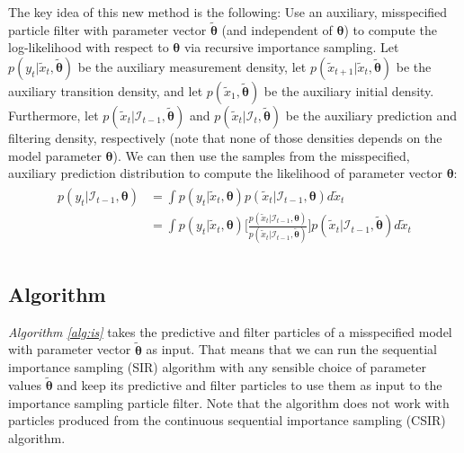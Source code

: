 \documentclass[11pt, oneside]{scrreprt}   	%
\begin{document}
The key idea of this new method is the following: Use an auxiliary, misspecified particle filter with parameter vector $\boldsymbol{\tilde{\theta}}$ (and independent of $\boldsymbol{\theta}$) to compute the log-likelihood with respect to $\boldsymbol{\theta}$ via recursive importance sampling. Let $p(y_t | \tilde{x}_{t}, \boldsymbol{\tilde{\theta}})$ be the auxiliary measurement density, let $p(\tilde{x}_{t+1} | \tilde{x}_{t}, \boldsymbol{\tilde{\theta}})$ be the auxiliary transition density, and let $p(\tilde{x}_1, \boldsymbol{\tilde{\theta}})$ be the auxiliary initial density. Furthermore, let $p(\tilde{x}_{t} | \mathcal{I}_{t-1}, \boldsymbol{\tilde{\theta}})$ and  $p(\tilde{x}_{t} | \mathcal{I}_{t}, \boldsymbol{\tilde{\theta}})$ be the auxiliary prediction and filtering density, respectively (note that none of those densities depends on the model parameter $\boldsymbol{\theta}$). We can then use the samples from the misspecified, auxiliary prediction distribution to compute the likelihood of parameter vector $\boldsymbol{\theta}$: 
\begin{align*} 
\begin{split}
p(y_t | \mathcal{I}_{t-1}, \boldsymbol{\theta}) &= \int p(y_t | \tilde{x}_t, \boldsymbol{\theta}) p(\tilde{x}_t | \mathcal{I}_{t-1}, \boldsymbol{\theta}) d \tilde{x}_t \\
&= \int p(y_t | \tilde{x}_t, \boldsymbol{\theta}) \bigg[ \frac{p(\tilde{x}_t | \mathcal{I}_{t-1}, \boldsymbol{\theta})}{p(\tilde{x}_t | \mathcal{I}_{t-1}, \boldsymbol{\tilde{\theta}})} \bigg] p(\tilde{x}_t | \mathcal{I}_{t-1}, \boldsymbol{\tilde{\theta}}) d \tilde{x}_t \\
\end{split}					
\end{align*}  

\subsection{Algorithm}
\textit{Algorithm \ref{alg:is}} takes the predictive and filter particles of a misspecified model with parameter vector $\boldsymbol{\tilde{\theta}}$ as input. That means that we can run the sequential importance sampling (SIR) algorithm with any sensible choice of parameter values $\boldsymbol{\tilde{\theta}}$ and keep its predictive and filter particles to use them as input to the importance sampling particle filter. Note that the algorithm does not work with particles produced from the continuous sequential importance sampling (CSIR) algorithm.\\
\end{document}
